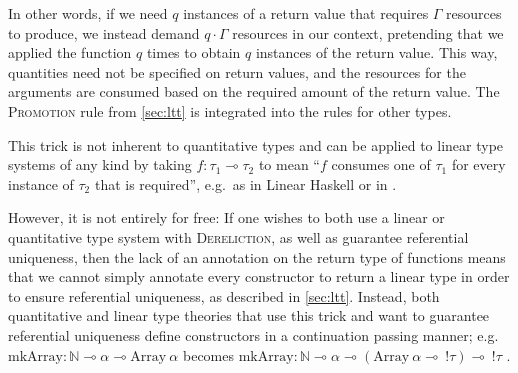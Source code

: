 In other words, if we need $q$ instances of a return value that requires $\Gamma$ resources to produce, we instead demand $q \cdot \Gamma$ resources in our context, pretending that we applied the function $q$ times to obtain $q$ instances of the return value. This way, quantities need not be specified on return values, and the resources for the arguments are consumed based on the required amount of the return value. The \textsc{Promotion} rule from \cref{sec:ltt} is integrated into the rules for other types.

This trick is not inherent to quantitative types and can be applied to linear type systems of any kind by taking $f : \tau_1 \multimap \tau_2$ to mean ``$f$ consumes one of $\tau_1$ for every instance of $\tau_2$ that is required'', e.g.\ as in Linear Haskell \citep{bernardy_linear_2018} or in \cite{ghica_bounded_2014}. 

However, it is not entirely for free: If one wishes to both use a linear or quantitative type system with \textsc{Dereliction}, as well as guarantee referential uniqueness, then the lack of an annotation on the return type of functions means that we cannot simply annotate every constructor to return a linear type in order to ensure referential uniqueness, as described in \cref{sec:ltt}. 
Instead, both quantitative and linear type theories that use this trick and want to guarantee referential uniqueness define constructors in a continuation passing manner; e.g.\ $\mathrm{mkArray} : \mathbb{N} \multimap \alpha \multimap \mathrm{Array}\ \alpha$ becomes $\mathrm{mkArray} : \mathbb{N} \multimap \alpha \multimap (\mathrm{Array}\ \alpha \multimap\ !\tau) \multimap\ !\tau$ \citep{bernardy_linear_2018}.

